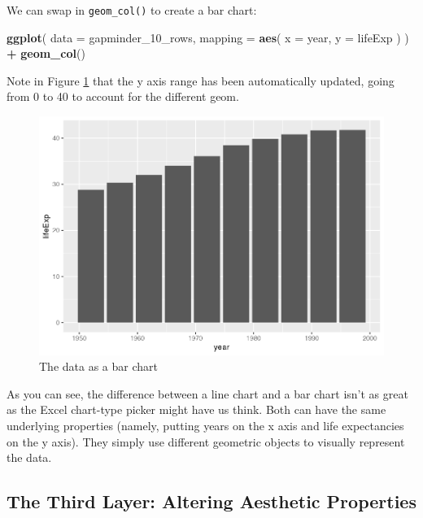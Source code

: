 \documentclass[
]{book}
\newenvironment{Shaded}{\begin{snugshade}}{\end{snugshade}}
\newcommand{\AttributeTok}[1]{\textcolor[rgb]{0.13,0.29,0.53}{#1}}
\newcommand{\FunctionTok}[1]{\textcolor[rgb]{0.13,0.29,0.53}{\textbf{#1}}}
\newcommand{\NormalTok}[1]{#1}
\newcommand{\SpecialCharTok}[1]{\textcolor[rgb]{0.81,0.36,0.00}{\textbf{#1}}}
\begin{document}
We can swap in \texttt{geom\_col()} to create a bar chart:

\begin{Shaded}
\begin{Highlighting}[]
\FunctionTok{ggplot}\NormalTok{(}
  \AttributeTok{data =}\NormalTok{ gapminder\_10\_rows,}
  \AttributeTok{mapping =} \FunctionTok{aes}\NormalTok{(}
    \AttributeTok{x =}\NormalTok{ year,}
    \AttributeTok{y =}\NormalTok{ lifeExp}
\NormalTok{  )}
\NormalTok{) }\SpecialCharTok{+}
  \FunctionTok{geom\_col}\NormalTok{()}
\end{Highlighting}
\end{Shaded}

Note in Figure \ref{fig:gapminder-bar-plot} that the y axis range has been automatically updated, going from 0 to 40 to account for the different geom.

\begin{figure}
\includegraphics[width=1\linewidth]{data-viz_files/figure-latex/gapminder-bar-plot-1} \caption{The data as a bar chart}\label{fig:gapminder-bar-plot}
\end{figure}

As you can see, the difference between a line chart and a bar chart isn't as great as the Excel chart-type picker might have us think. Both can have the same underlying properties (namely, putting years on the x axis and life expectancies on the y axis). They simply use different geometric objects to visually represent the data.

\hypertarget{the-third-layer-altering-aesthetic-properties}{%
\subsection*{The Third Layer: Altering Aesthetic Properties}\label{the-third-layer-altering-aesthetic-properties}}
\end{document}
